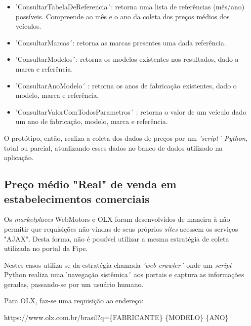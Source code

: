 \documentclass[conference]{IEEEtran}
\begin{document}
\begin{itemize}
	\item 'ConsultarTabelaDeReferencia´: retorna uma lista de referências (mês/ano) possíveis. Compreende ao mês e o ano da coleta dos preços médios dos veículos.
	\item 'ConsultarMarcas´: retorna as marcas presentes uma dada referência.
	\item 'ConsultarModelos´: retorna os modelos existentes nos resultados, dado a marca e referência.
	\item 'ConsultarAnoModelo´ : retorna os anos de fabricação existentes, dado o modelo, marca e referência.
	\item 'ConsultarValorComTodosParametros´ : retorna o valor de um veículo dado um ano de fabricação, modelo, marca e referência. 
\end{itemize}

O protótipo, então, realiza a coleta dos dados de preços por um \textit{'script´ Python}, total ou parcial, atualizando esses dados no banco de dados utilizado na aplicação.


\subsection{Preço médio "Real" de venda em estabelecimentos comerciais}

Os \textit{marketplaces} WebMotors e OLX foram desenvolvidos de maneira à não permitir que requisições não vindas de seus próprios \textit{sites} acessem os serviços "AJAX". Desta forma, não é possível utilizar a mesma estratégia de coleta utilizada no portal da Fipe.

Nestes casos utiliza-se da estratégia chamada \textit{'web crawler´} onde um \textit{script} Python realiza uma 'navegação sistêmica´ aos portais e captura as informações geradas, passando-se por um usuário humano. 

Para OLX, faz-se uma requisição ao endereço:

https://www.olx.com.br/brasil?q=\{FABRICANTE\} \{MODELO\} \{ANO\}
\end{document}
